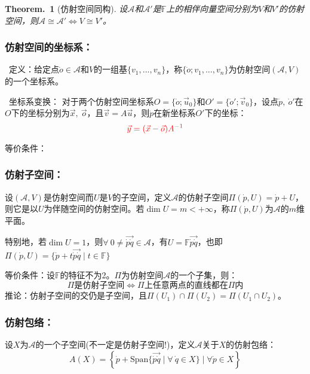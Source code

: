 \documentclass[zihao=-4,UTF8]{report}
\def\F{\mathbb{F}}
\def\A{\mathscr{A}}
\theoremstyle{mystyle} %
\newtheorem{theorem}{Theorem.\,}
\begin{document}
\begin{theorem}[仿射空间同构]\label{仿射空间同构}
设$\A$和$\A'$是$\F$上的相伴向量空间分别为$V$和$V'$的仿射空间，则$\A\cong\A' \Longleftrightarrow V \cong V' $。
\end{theorem}


\subsubsection{仿射空间的坐标系：}
\par{}\ 定义：给定点$\dot{o}\in \A$和$V$的一组基$\{v_1,...,v_n\}$，称$\{\dot{o};v_1,...,v_n\}$为仿射空间$(\A,V)$的一个坐标系。
\par
{}\  坐标系变换： 
对于两个仿射空间坐标系$O = \{\dot{o};\vec{u}_0\}$和$O' = \{\dot{o}';\vec{v}_0\}$，设点$\dot{p},\ \dot{o}'$在$O$下的坐标分别为$\vec{x},\ \vec{o}$，且$\vec{v} = A\vec{u}$，则$\dot{p}$在新坐标系$O'$下的坐标：
\begin{equation*}
    \textcolor{red}{\vec{y} = (\vec{x} - \vec{o})A^{-1}}
\end{equation*}
\par
等价条件：
\subsubsection{仿射子空间：}
设$(\A,V)$是仿射空间而$U$是$V$的子空间，定义$\A$的仿射子空间$\Pi(\dot{p},U) = \dot{p} + U$，则它是以$U$为伴随空间的仿射空间。若$\dim U = m< +\infty$，称$\Pi(\dot{p},U)$为$\A$的$m$维平面。\par
特别地，若$\dim U = 1$，则$\forall\  0 \ne\overrightarrow{\dot{p}\dot{q}} \in \A$，有$U = \F\overrightarrow{\dot{p}\dot{q}}$，也即$\Pi (\dot{p},U) =\{\dot{p} + t\overrightarrow{\dot{p}\dot{q}}\mid t \in \F\} $

等价条件：设$\F$的特征不为2。$\Pi$为仿射空间$\A$的一个子集，则：
\begin{equation*}
    \text{$\Pi$是仿射子空间} \Longleftrightarrow \Pi\text{上任意两点的直线都在$\Pi$内}
\end{equation*}
推论：仿射子空间的交仍是子空间，且$\Pi(U_1)\cap\Pi(U_2) = \Pi(U_1\cap U_2)$。


\subsubsection{仿射包络：}
设$X$为$\A$的一个子空间(不一定是仿射子空间!)，定义$\A$关于$X$的仿射包络：
\begin{equation*}
    A(X) = \left\{  \dot{p} +\text{Span}\{\overrightarrow{\dot{p}\dot{q}}\mid\forall\  \dot{q} \in X\}\mid \forall \dot{p}\in X \right\}
\end{equation*}
\end{document}
